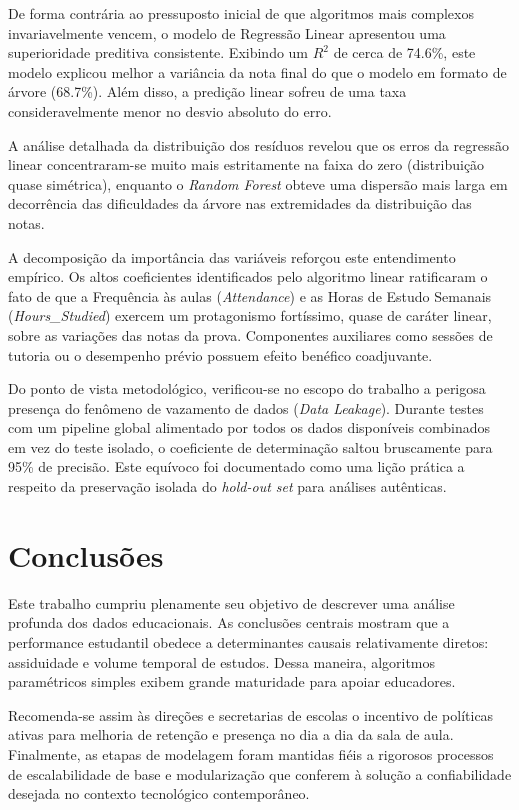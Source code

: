 \documentclass[12pt]{article}
\begin{document}
De forma contrária ao pressuposto inicial de que algoritmos mais complexos invariavelmente vencem, o modelo de Regressão Linear apresentou uma superioridade preditiva consistente. Exibindo um $R^{2}$ de cerca de 74.6\%, este modelo explicou melhor a variância da nota final do que o modelo em formato de árvore (68.7\%). Além disso, a predição linear sofreu de uma taxa consideravelmente menor no desvio absoluto do erro.

A análise detalhada da distribuição dos resíduos revelou que os erros da regressão linear concentraram-se muito mais estritamente na faixa do zero (distribuição quase simétrica), enquanto o \textit{Random Forest} obteve uma dispersão mais larga em decorrência das dificuldades da árvore nas extremidades da distribuição das notas.

A decomposição da importância das variáveis reforçou este entendimento empírico. Os altos coeficientes identificados pelo algoritmo linear ratificaram o fato de que a Frequência às aulas (\textit{Attendance}) e as Horas de Estudo Semanais (\textit{Hours\_Studied}) exercem um protagonismo fortíssimo, quase de caráter linear, sobre as variações das notas da prova. Componentes auxiliares como sessões de tutoria ou o desempenho prévio possuem efeito benéfico coadjuvante.

Do ponto de vista metodológico, verificou-se no escopo do trabalho a perigosa presença do fenômeno de vazamento de dados (\textit{Data Leakage}). Durante testes com um pipeline global alimentado por todos os dados disponíveis combinados em vez do teste isolado, o coeficiente de determinação saltou bruscamente para 95\% de precisão. Este equívoco foi documentado como uma lição prática a respeito da preservação isolada do \textit{hold-out set} para análises autênticas.

\section{Conclusões}

Este trabalho cumpriu plenamente seu objetivo de descrever uma análise profunda dos dados educacionais. As conclusões centrais mostram que a performance estudantil obedece a determinantes causais relativamente diretos: assiduidade e volume temporal de estudos. Dessa maneira, algoritmos paramétricos simples exibem grande maturidade para apoiar educadores.

Recomenda-se assim às direções e secretarias de escolas o incentivo de políticas ativas para melhoria de retenção e presença no dia a dia da sala de aula. Finalmente, as etapas de modelagem foram mantidas fiéis a rigorosos processos de escalabilidade de base e modularização que conferem à solução a confiabilidade desejada no contexto tecnológico contemporâneo.
\end{document}
